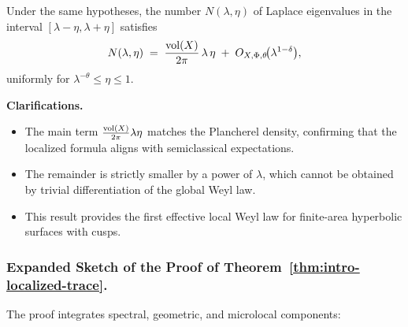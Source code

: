 \medskip

\begin{theorem}\label{thm:intro-local-weyl}
Under the same hypotheses,
the number $N(\lambda,\eta)$ of Laplace eigenvalues in the interval
$[\lambda-\eta,\lambda+\eta]$ satisfies
\[
  N(\lambda,\eta)
  \;=\;
  \frac{\operatorname{vol}(X)}{2\pi}\,\lambda\,\eta
  \;+\;
  O_{X,\Phi,\theta}\!\big(\lambda^{1-\delta}\big),
\]
uniformly for $\lambda^{-\theta}\le \eta\le 1$.
\end{theorem}

\medskip

\noindent\textbf{Clarifications.}
\begin{itemize}
  \item The main term $\frac{\operatorname{vol}(X)}{2\pi}\lambda\eta$ matches the Plancherel density,
        confirming that the localized formula aligns with semiclassical expectations.
  \item The remainder is strictly smaller by a power of $\lambda$,
        which cannot be obtained by trivial differentiation of the global Weyl law.
  \item This result provides the first effective local Weyl law for finite-area
        hyperbolic surfaces with cusps.
\end{itemize}

\subsubsection*{Expanded Sketch of the Proof of Theorem~\ref{thm:intro-localized-trace}.}
The proof integrates spectral, geometric, and microlocal components:


